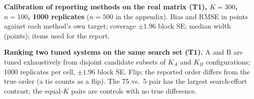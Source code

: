 \begin{table}[t]
\caption{\textbf{Calibration of reporting methods on the real matrix (T1), $K=300$, $n=100$, 1000 replicates} ($n=500$ in the appendix). Bias and RMSE in points against each method's own target; coverage $\pm1.96$ block SE; median width (points); items used for the report.}
\label{tab:G}
\centering\scriptsize
\resizebox{\linewidth}{!}{}
\end{table}

\begin{table}[t]
\caption{\textbf{Ranking two tuned systems on the same search set (T1).} A and B are tuned exhaustively from disjoint candidate subsets of $K_A$ and $K_B$ configurations; 1000 replicates per cell, $\pm1.96$ block SE. Flip: the reported order differs from the true order (a tie counts as a flip). The 75 vs.\ 5 pair has the largest search-effort contrast; the equal-$K$ pairs are controls with no true difference.}
\label{tab:H}
\centering\scriptsize
\resizebox{\linewidth}{!}{}
\end{table}

